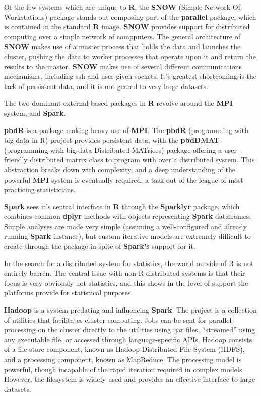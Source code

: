 Of the few systems which are unique to \textbf{R}, the \textbf{SNOW} (Simple Network Of Workstations) package stands out composing part of the \textbf{parallel} package, which is contained in the standard \textbf{R} image\cite{tierney18}.
\textbf{SNOW} provides support for distributed computing over a simple network of compputers.
The general architecture of \textbf{SNOW} makes use of a master process that holds the data and launches the cluster, pushing the data to worker processes that operate upon it and return the results to the master.
\textbf{SNOW} makes use of several different communications mechanisms, including ssh and user-given sockets.
It's greatest shortcoming is the lack of persistent data, and it is not geared to very large datasets.

The two dominant external-based packages in \textbf{R} revolve around the \textbf{MPI} system, and \textbf{Spark}.

\textbf{pbdR} is a package making heavy use of \textbf{MPI}\cite{pbdR2012}.
The \textbf{pbdR} (programming with big data in R) project provides persistent data, with the \textbf{pbdDMAT} (programming with big data Distributed MATrices) package offering a user-friendly distributed matrix class to program with over a distributed system\cite{pbdDMATpackage}.
This abstraction breaks down with complexity, and a deep understanding of the powerful \textbf{MPI} system is eventually required, a task out of the league of most practicing statisticians.

\textbf{Spark} sees it's central interface in \textbf{R} through the \textbf{Sparklyr} package, which combines common \textbf{dplyr} methods with objects representing \textbf{Spark} dataframes\cite{luraschi20}.
Simple analyses are made very simple (assuming a well-configured and already running \textbf{Spark} instance), but custom iterative models are extremely difficult to create through the package in spite of \textbf{Spark's} support for it.

In the search for a distributed system for statistics, the world outside of R is not entirely barren.
The central issue with non-R distributed systems is that their focus is very obviously not statistics, and this shows in the level of support the platforms provide for statistical purposes.

\textbf{Hadoop} is a system predating and influencing \textbf{Spark}\cite{shvachko2010hadoop}.
The project is a collection of utilities that facilitates cluster computing.
Jobs can be sent for parallel processing on the cluster directly to the utilities using .jar files, ``streamed'' using any executable file, or accessed through language-specific APIs.
Hadoop consists of a file-store component, known as Hadoop Distributed File System (HDFS), and a processing component, known as MapReduce.
The processing model is powerful, though incapable of the rapid iteration required in complex models.
However, the filesystem is widely used and provides an effective interface to large datasets.

